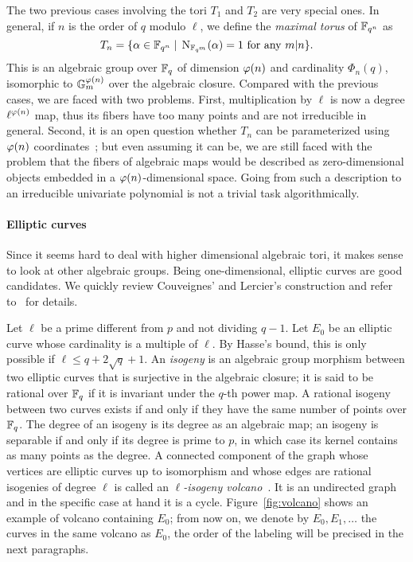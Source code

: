 \documentclass{sig-alternate}
\begin{document}
The two previous cases involving the tori $T_1$ and $T_2$ are very
special ones. In general, if $n$ is the order of $q$ modulo $\ell$, we
define the \emph{maximal torus} of $\mathbb{F}_{q^n}$ as
\begin{equation}
  \label{eq:T2-def}
  T_n = \{\alpha\in\mathbb{F}_{q^n} \;|\; \operatorname{N}_{\mathbb{F}_{q^m}}(\alpha) = 1 
  \text{ for any $m|n$} \}.
\end{equation}
This is an algebraic group over $\mathbb{F}_q$ of dimension $\varphi(n)$ and
cardinality $\Phi_n(q)$, isomorphic to $\mathbb{G}_m^{\varphi(n)}$ over
the algebraic closure. Compared with the previous cases, we are faced
with two problems. First, multiplication by $\ell$ is now a degree
$\ell^{\varphi(n)}$ map, thus its fibers have too many points and are
not irreducible in general. Second, it is an open question whether
$T_n$ can be parameterized using $\varphi(n)$
coordinates~\cite{rubin-silverberg+crypto03,rubin+silverberg03,voskresenskii98};
but even assuming it can be, we are still faced with the problem that
the fibers of algebraic maps would be described as zero-dimensional
objects embedded in a $\varphi(n)$-dimensional space. Going from such a
description to an irreducible univariate polynomial is not a trivial
task algorithmically.

\paragraph{Elliptic curves}
Since it seems hard to deal with higher dimensional algebraic tori, it
makes sense to look at other algebraic groups. Being one-dimensional,
elliptic curves are good candidates. We quickly review Couveignes' and
Lercier's construction and refer to~\cite{couveignes+lercier11} for
details.

Let $\ell$ be a prime different from $p$ and not dividing $q-1$. Let
$E_0$ be an elliptic curve whose cardinality is a multiple of
$\ell$. By Hasse's bound, this is only possible if $\ell\le q +
2\sqrt{q} + 1$. An \emph{isogeny} is an algebraic group morphism
between two elliptic curves that is surjective in the algebraic
closure; it is said to be rational over $\mathbb{F}_q$ if it is invariant
under the $q$-th power map. A rational isogeny between two curves
exists if and only if they have the same number of points over
$\mathbb{F}_q$. The degree of an isogeny is its degree as an algebraic map; an
isogeny is separable if and only if its degree is prime to $p$, in
which case its kernel contains as many points as the degree. A
connected component of the graph whose vertices are elliptic curves up
to isomorphism and whose edges are rational isogenies of degree $\ell$
is called an \emph{$\ell$-isogeny
  volcano}~\cite{kohel,fouquet+morain02}. It is an undirected graph
and in the specific case at hand it is a
cycle. Figure~\ref{fig:volcano} shows an example of volcano containing
$E_0$; from now on, we denote by $E_0,E_1,\dots$ the curves in the
same volcano as $E_0$, the order of the labeling will be precised in
the next paragraphs.
\end{document}
